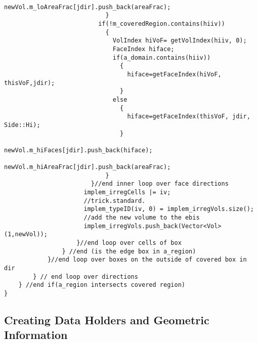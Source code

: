 \begin{small}
\begin{verbatim}
                              newVol.m_loAreaFrac[jdir].push_back(areaFrac);
                            }
                          if(!m_coveredRegion.contains(hiiv))
                            {
                              VolIndex hiVoF= getVolIndex(hiiv, 0);
                              FaceIndex hiface;
                              if(a_domain.contains(hiiv))
                                {
                                  hiface=getFaceIndex(hiVoF, thisVoF,jdir);
                                }
                              else
                                {
                                  hiface=getFaceIndex(thisVoF, jdir, Side::Hi);
                                }
                              newVol.m_hiFaces[jdir].push_back(hiface);
                              newVol.m_hiAreaFrac[jdir].push_back(areaFrac);
                            }
                        }//end inner loop over face directions
                      implem_irregCells |= iv;
                      //trick.standard.
                      implem_typeID(iv, 0) = implem_irregVols.size();
                      //add the new volume to the ebis
                      implem_irregVols.push_back(Vector<Vol>(1,newVol));
                    }//end loop over cells of box
                } //end (is the edge box in a_region)
            }//end loop over boxes on the outside of covered box in dir
        } // end loop over directions
    } //end if(a_region intersects covered region)
}
\end{verbatim}
\end{small}
\subsection{Creating Data Holders and Geometric Information}

